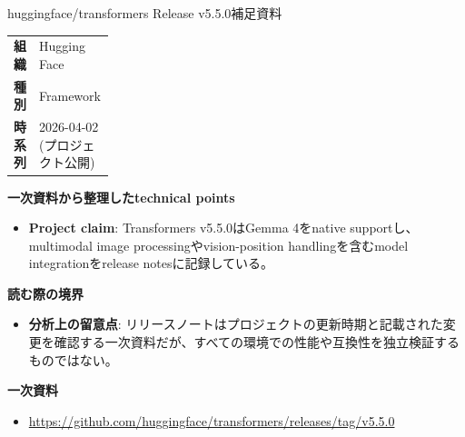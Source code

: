 \begin{technicalnote}{huggingface/transformers Release v5.5.0}{補足資料}
\begingroup
\begin{tabularx}{\linewidth}{@{}>{\bfseries}p{0.22\linewidth}X@{}}
組織 & Hugging Face \\
種別 & Framework \\
時系列 & 2026-04-02 (プロジェクト公開) \\
\end{tabularx}
\smallskip
{\bfseries 一次資料から整理したtechnical points}
\begin{itemize}[leftmargin=1.5em,itemsep=0.35em]
\item \textbf{Project claim}: Transformers v5.5.0はGemma 4をnative supportし、multimodal image processingやvision-position handlingを含むmodel integrationをrelease notesに記録している。
\end{itemize}
\begin{minipage}{\linewidth}
{\bfseries 読む際の境界}
\begin{itemize}[leftmargin=1.5em,itemsep=0.35em]
\item \textbf{分析上の留意点}: リリースノートはプロジェクトの更新時期と記載された変更を確認する一次資料だが、すべての環境での性能や互換性を独立検証するものではない。
\end{itemize}
\begin{samepage}
{\bfseries 一次資料}
\begingroup\sloppy
\begin{itemize}[leftmargin=1.5em,itemsep=0.25em]
\item {\scriptsize\url{https://github.com/huggingface/transformers/releases/tag/v5.5.0}}
\end{itemize}
\endgroup
\end{samepage}
\end{minipage}
\endgroup
\end{technicalnote}
\medskip
